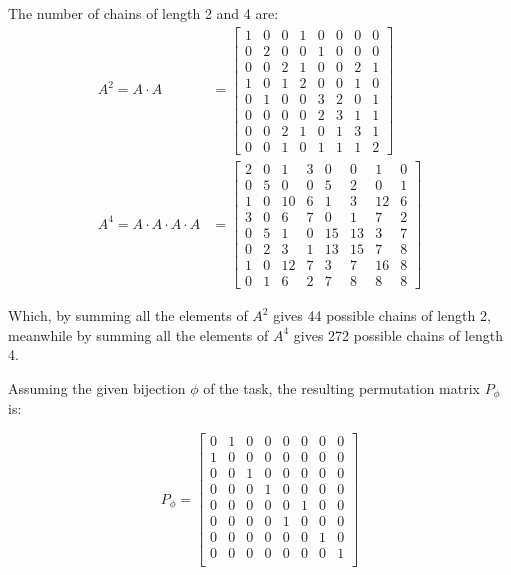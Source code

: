 \documentclass{article}
\begin{document}
    \noindent The number of chains of length 2 and 4 are:
    \begin{align*}
        A^{2} = A \cdot A &= 
        \begin{bmatrix}
        1 & 0 & 0 & 1 & 0 & 0 & 0 & 0\\
        0 & 2 & 0 & 0 & 1 & 0 & 0 & 0\\
        0 & 0 & 2 & 1 & 0 & 0 & 2 & 1\\
        1 & 0 & 1 & 2 & 0 & 0 & 1 & 0\\
        0 & 1 & 0 & 0 & 3 & 2 & 0 & 1\\
        0 & 0 & 0 & 0 & 2 & 3 & 1 & 1\\
        0 & 0 & 2 & 1 & 0 & 1 & 3 & 1\\
        0 & 0 & 1 & 0 & 1 & 1 & 1 & 2
        \end{bmatrix}\\
        A^{4} = A \cdot A \cdot A \cdot A &= 
        \begin{bmatrix}
        2 & 0 & 1 & 3 & 0 & 0 & 1 & 0\\
        0 & 5 & 0 & 0 & 5 & 2 & 0 & 1\\
        1 & 0 & 10 & 6 & 1 & 3 & 12 & 6\\
        3 & 0 & 6 & 7 & 0 & 1 & 7 & 2\\
        0 & 5 & 1 & 0 & 15 & 13 & 3 & 7\\
        0 & 2 & 3 & 1 & 13 & 15 & 7 & 8\\
        1 & 0 & 12 & 7 & 3 & 7 & 16 & 8\\
        0 & 1 & 6 & 2 & 7 & 8 & 8 & 8
        \end{bmatrix}
    \end{align*}
    
    \noindent Which, by summing all the elements of \(A^{2}\) gives 44 possible chains of length 2, meanwhile by summing all the elements of \(A^{4}\) gives 272 possible chains of length 4.\newline
    
    \par\noindent Assuming the given bijection \(\phi\) of the task, the resulting permutation matrix \(P_{\phi}\) is:
    
    \[
    P_{\phi}=
    \begin{bmatrix}
        0 & 1 & 0 & 0 & 0 & 0 & 0 & 0\\
        1 & 0 & 0 & 0 & 0 & 0 & 0 & 0\\
        0 & 0 & 1 & 0 & 0 & 0 & 0 & 0\\
        0 & 0 & 0 & 1 & 0 & 0 & 0 & 0\\
        0 & 0 & 0 & 0 & 0 & 1 & 0 & 0\\
        0 & 0 & 0 & 0 & 1 & 0 & 0 & 0\\
        0 & 0 & 0 & 0 & 0 & 0 & 1 & 0\\
        0 & 0 & 0 & 0 & 0 & 0 & 0 & 1\\
    \end{bmatrix}
    \]
    
\end{document}
